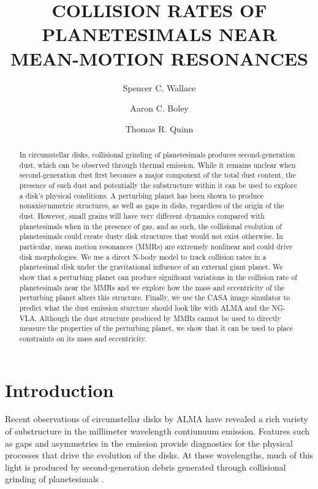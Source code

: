 \documentclass[onecolumn]{aastex63}
\begin{document}
\title{COLLISION RATES OF PLANETESIMALS NEAR MEAN-MOTION RESONANCES}

\author{Spencer C. Wallace}

\author{Aaron C. Boley}

\author{Thomas R. Quinn}

\begin{abstract}
In circumstellar disks, collisional grinding of planetesimals produces second-generation dust, which can be observed through thermal 
emission. While it remains unclear when second-generation dust first becomes a major component of the total dust content, the presence of 
such dust and potentially the substructure within it can be used to explore a disk's physical conditions. A perturbing planet has been shown to 
produce nonaxisymmetric structures, as well as gaps in disks, regardless of the origin of the dust. However, small grains will have very 
different dynamics compared with planetesimals when in the presence of gas, and as such, the collisional evolution of planetesimals could 
create dusty disk structures that would not exist otherwise. In particular, mean motion resonances (MMRs) are extremely nonlinear and could 
drive disk morphologies. We use a direct N-body model to track collision rates in a planetesimal disk under the gravitational influence of an 
external giant planet. We show that a perturbing planet can produce significant variations in the collision rate of planetesimals near the 
MMRs and we explore how the mass and eccentricity of the perturbing planet alters this structure. Finally, we use the CASA image simulator to 
predict what the dust emission sturcture should look like with ALMA and the NG-VLA. Although the dust structure produced by MMRs cannot 
be used to directly measure the properties of the perturbing planet, we show that it can be used to place constraints on its mass and 
eccentricity.
\end{abstract}

\section{Introduction} \label{sec:intro}

Recent observations of circumstellar disks by ALMA have revealed a rich variety of substructure in the millimeter wavelength
contiunuum emission. Features such as gaps and asymmetries 
\citep{2015ApJ...808L...3A, 2016Sci...353.1519P, PhysRevLett.117.251101, 2016ApJ...820L..40A, 2016Natur.535..258C} in the 
emission provide diagnostics for the physical processes that drive the evolution of the disks. At these wavelengths, much of this light 
is produced by second-generation debris generated through collisional grinding of planetesimals
\citep[see][]{2008ARA&A..46..339W}. 
\end{document}
